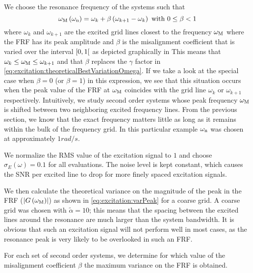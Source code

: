   We choose the resonance frequency of the systems such that
  \begin{equation}
   \omega_{\mathrm{M}}\left( \omega_{\mathrm{n}} \right)  = \omega_k + \beta \left( \omega_{k+1} - \omega_k \right)
   \text{ with } 0 \leq \beta < 1
   \label{eq:excitation:chosenVariationOmega}
  \end{equation}
  where $\omega_k$ and $\omega_{k+1}$ are the excited grid lines closest to the frequency $\omega_{\mathrm{M}}$ where the FRF has its peak amplitude and $\beta$ is the misalignment coefficient that is varied over the interval $\left[ 0,1 \right[$ as depicted graphically in 
  This means that $\omega_k \leq \omega_{\mathrm{M}} \leq \omega_{k+1}$ and that $\beta$ replaces the $\gamma$ factor in \eqref{eq:excitation:theoreticalBestVariationOmega}.
  If we take a look at the special case when $\beta=0$ (or $\beta=1$) in this expression, we see that this situation occurs when the peak value of the \gls{FRF} at $\omega_{\mathrm{M}}$ coincides with the grid line $\omega_k$ or $\omega_{k+1}$ respectively.
  Intuitively, we study second order systems whose peak frequency $\omega_{\mathrm{M}}$ is shifted between two neighboring excited frequency lines.
  From the previous section, we know that the exact frequency matters little as long as it remains within the bulk of the frequency grid.
  In this particular example $\omega_{\mathrm{n}}$ was chosen at approximately $1 \unit{rad/s}$.

  We normalize the \gls{RMS} value of the excitation signal to $1$ and choose $\sigma_E\left( \omega \right) = 0.1$ for all evaluations.
  The noise level is kept constant, which causes the \gls{SNR} per excited line to drop for more finely spaced excitation signals.
  
  We then calculate the theoretical variance on the magnitude of the peak in the \gls{FRF} ($\left| G\left( \omega_{\mathrm{M}} \right) \right|$) as shown in \eqref{eq:excitation:varPeak} for a coarse grid.
  A coarse grid was chosen with $\tilde{\alpha} = 10$; this means that the spacing between the excited lines around the resonance are much larger than the system bandwidth.
  It is obvious that such an excitation signal will not perform well in most cases, as the resonance peak is very likely to be overlooked in such an \gls{FRF}.
  
  For each set of second order systems, we determine for which value of the misalignment coefficient $\beta$ the maximum variance on the FRF is obtained.
  
